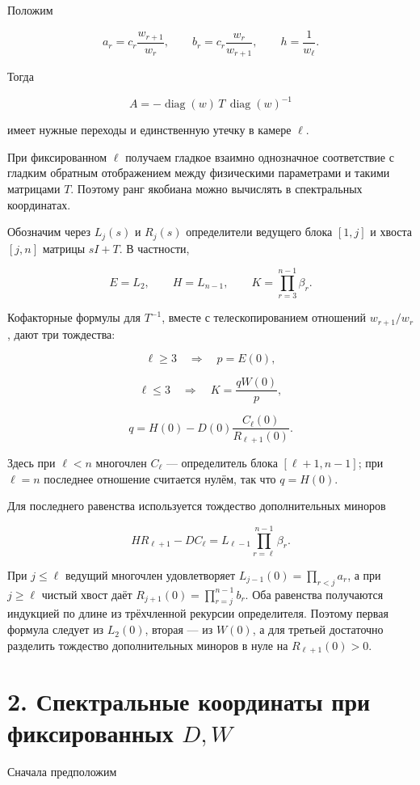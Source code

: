 \documentclass[11pt,a4paper]{article}
\begin{document}
Положим

\[
\boxed{
a_r=c_r\frac{w_{r+1}}{w_r},\qquad
b_r=c_r\frac{w_r}{w_{r+1}},\qquad
h=\frac1{w_\ell}.}
\]

Тогда

\[
A=-\operatorname{diag}(w)\,T\,\operatorname{diag}(w)^{-1}
\]

имеет нужные переходы и единственную утечку в камере \(\ell\).

При фиксированном \(\ell\) получаем гладкое взаимно однозначное соответствие с гладким обратным отображением между физическими параметрами и такими матрицами \(T\). Поэтому ранг якобиана можно вычислять в спектральных координатах.

Обозначим через \(L_j(s)\) и \(R_j(s)\) определители ведущего блока \([1,j]\) и хвоста \([j,n]\) матрицы \(sI+T\). В частности,

\[
E=L_2,\qquad H=L_{n-1},\qquad
K=\prod_{r=3}^{n-1}\beta_r.
\]

Кофакторные формулы для \(T^{-1}\), вместе с телескопированием отношений \(w_{r+1}/w_r\), дают три тождества:

\[
\ell\ge3\quad\Longrightarrow\quad p=E(0),
\]

\[
\ell\le3\quad\Longrightarrow\quad
K=\frac{qW(0)}p,
\]

\[
q=H(0)-D(0)\frac{C_\ell(0)}{R_{\ell+1}(0)}.
\]

Здесь при \(\ell<n\) многочлен \(C_\ell\) — определитель блока \([\ell+1,n-1]\); при \(\ell=n\) последнее отношение считается нулём, так что \(q=H(0)\).

Для последнего равенства используется тождество дополнительных миноров

\[
H R_{\ell+1}-D C_\ell
=
L_{\ell-1}\prod_{r=\ell}^{n-1}\beta_r.
\]

При \(j\le\ell\) ведущий многочлен удовлетворяет \(L_{j-1}(0)=\prod_{r<j}a_r\), а при \(j\ge\ell\) чистый хвост даёт \(R_{j+1}(0)=\prod_{r=j}^{n-1}b_r\). Оба равенства получаются индукцией по длине из трёхчленной рекурсии определителя. Поэтому первая формула следует из \(L_2(0)\), вторая — из \(W(0)\), а для третьей достаточно разделить тождество дополнительных миноров в нуле на \(R_{\ell+1}(0)>0\).

\section*{\color{ink} 2. Спектральные координаты при фиксированных \(D,W\)}

Сначала предположим
\end{document}
